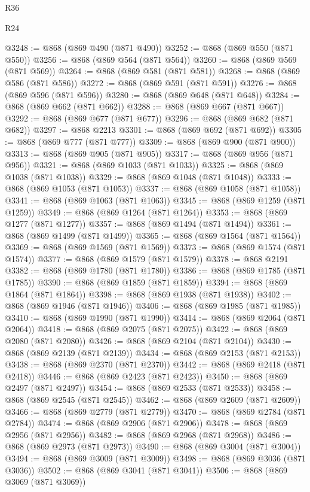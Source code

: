 \begin{lexlean}{R36}
\begin{lexlean}{R24}
\begin{coremodule}
{{{{{{{{{{{{{{{{{{{{{{{{{{{{{{{{{{{{{{{{{{{{{{{{{{{{{{{{{{{{{{{{{{{{{{{{{{{{{{{{{{{{{{{{{{{{{{{{{{{{{{{{{{{{{{{{{{{{{{{{{{{{{{{{{{{{{{{{{{{{{{{{{{{{{{{{{{{{{{{{{{{{{{{{{{{{{{{{{{{{{{{{{{{{{{{{{{{@3248 := @868 (@869 @490 (@871 @490))
@3252 := @868 (@869 @550 (@871 @550))
@3256 := @868 (@869 @564 (@871 @564))
@3260 := @868 (@869 @569 (@871 @569))
@3264 := @868 (@869 @581 (@871 @581))
@3268 := @868 (@869 @586 (@871 @586))
@3272 := @868 (@869 @591 (@871 @591))
@3276 := @868 (@869 @596 (@871 @596))
@3280 := @868 (@869 @648 (@871 @648))
@3284 := @868 (@869 @662 (@871 @662))
@3288 := @868 (@869 @667 (@871 @667))
@3292 := @868 (@869 @677 (@871 @677))
@3296 := @868 (@869 @682 (@871 @682))
@3297 := @868 @2213
@3301 := @868 (@869 @692 (@871 @692))
@3305 := @868 (@869 @777 (@871 @777))
@3309 := @868 (@869 @900 (@871 @900))
@3313 := @868 (@869 @905 (@871 @905))
@3317 := @868 (@869 @956 (@871 @956))
@3321 := @868 (@869 @1033 (@871 @1033))
@3325 := @868 (@869 @1038 (@871 @1038))
@3329 := @868 (@869 @1048 (@871 @1048))
@3333 := @868 (@869 @1053 (@871 @1053))
@3337 := @868 (@869 @1058 (@871 @1058))
@3341 := @868 (@869 @1063 (@871 @1063))
@3345 := @868 (@869 @1259 (@871 @1259))
@3349 := @868 (@869 @1264 (@871 @1264))
@3353 := @868 (@869 @1277 (@871 @1277))
@3357 := @868 (@869 @1494 (@871 @1494))
@3361 := @868 (@869 @1499 (@871 @1499))
@3365 := @868 (@869 @1564 (@871 @1564))
@3369 := @868 (@869 @1569 (@871 @1569))
@3373 := @868 (@869 @1574 (@871 @1574))
@3377 := @868 (@869 @1579 (@871 @1579))
@3378 := @868 @2191
@3382 := @868 (@869 @1780 (@871 @1780))
@3386 := @868 (@869 @1785 (@871 @1785))
@3390 := @868 (@869 @1859 (@871 @1859))
@3394 := @868 (@869 @1864 (@871 @1864))
@3398 := @868 (@869 @1938 (@871 @1938))
@3402 := @868 (@869 @1946 (@871 @1946))
@3406 := @868 (@869 @1985 (@871 @1985))
@3410 := @868 (@869 @1990 (@871 @1990))
@3414 := @868 (@869 @2064 (@871 @2064))
@3418 := @868 (@869 @2075 (@871 @2075))
@3422 := @868 (@869 @2080 (@871 @2080))
@3426 := @868 (@869 @2104 (@871 @2104))
@3430 := @868 (@869 @2139 (@871 @2139))
@3434 := @868 (@869 @2153 (@871 @2153))
@3438 := @868 (@869 @2370 (@871 @2370))
@3442 := @868 (@869 @2418 (@871 @2418))
@3446 := @868 (@869 @2423 (@871 @2423))
@3450 := @868 (@869 @2497 (@871 @2497))
@3454 := @868 (@869 @2533 (@871 @2533))
@3458 := @868 (@869 @2545 (@871 @2545))
@3462 := @868 (@869 @2609 (@871 @2609))
@3466 := @868 (@869 @2779 (@871 @2779))
@3470 := @868 (@869 @2784 (@871 @2784))
@3474 := @868 (@869 @2906 (@871 @2906))
@3478 := @868 (@869 @2956 (@871 @2956))
@3482 := @868 (@869 @2968 (@871 @2968))
@3486 := @868 (@869 @2973 (@871 @2973))
@3490 := @868 (@869 @3004 (@871 @3004))
@3494 := @868 (@869 @3009 (@871 @3009))
@3498 := @868 (@869 @3036 (@871 @3036))
@3502 := @868 (@869 @3041 (@871 @3041))
@3506 := @868 (@869 @3069 (@871 @3069))
}}}}}}}}}}}}}}}}}}}}}}}}}}}}}}}}}}}}}}}}}}}}}}}}}}}}}}}}}}}}}}}}}}}}}}}}}}}}}}}}}}}}}}}}}}}}}}}}}}}}}}}}}}}}}}}}}}}}}}}}}}}}}}}}}}}}}}}}}}}}}}}}}}}}}}}}}}}}}}}}}}}}}}}}}}}}}}}}}}}}}}}}}}}}}}}}}}}
\end{coremodule}
\end{lexlean}
\end{lexlean}
